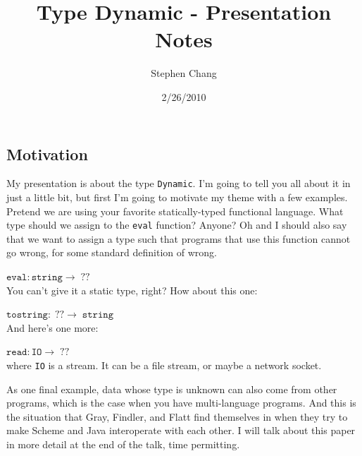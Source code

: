 \documentclass[12pt]{article}	%
\begin{document}
\newcommand{\Dynamic}{\texttt{Dynamic}\xspace}
\newcommand{\typecase}{\texttt{typecase}\xspace}
\newcommand{\dynamic}{\texttt{dynamic}\xspace}
\newcommand{\wrong}{\texttt{wrong}\xspace}
\newcommand{\deno}[1]{ \ensuremath{[\![#1]\!]} }
\newcommand{\code}[1]{$\mathtt{#1}$}
\newcommand{\pair}[2]{ \ensuremath{\left\langle #1,#2 \right\rangle} }
\newcommand{\pairtt}[2]{ \ensuremath{\left\langle \mathtt{#1,#2} \right\rangle} }
\newcommand{\dyn}[2]{ \ensuremath{ \pairtt{v}{\tau}_\texttt{Dyn} } }

\newcommand{\eval}{ \ensuremath{\Rightarrow} }

\title{Type Dynamic - Presentation Notes}
\author{Stephen Chang}
\date{2/26/2010}
\maketitle

\subsection*{Motivation}
My presentation is about the type \Dynamic. I'm going to tell you all about it in just a little bit, but first I'm going to motivate my theme with a few examples. Pretend we are using your favorite statically-typed functional language. What type should we assign to the \texttt{eval} function? Anyone? Oh and I should also say that we want to assign a type such that programs that use this function cannot go wrong, for some standard definition of wrong.

$\;$\\
\code{eval:string\rightarrow\;??}
$\;$\\

\noindent You can't give it a static type, right? How about this one:

$\;$\\
\code{tostring:\;??\rightarrow\;string}
$\;$\\

\noindent And here's one more:

$\;$\\
\code{read:IO\rightarrow\;??}
$\;$\\

\noindent where \texttt{IO} is a stream. It can be a file stream, or maybe a network socket.

As one final example, data whose type is unknown can also come from other programs, which is the case when you have multi-language programs. And this is the situation that Gray, Findler, and Flatt find themselves in when they try to make Scheme and Java interoperate with each other. I will talk about this paper in more detail at the end of the talk, time permitting.
\end{document}
